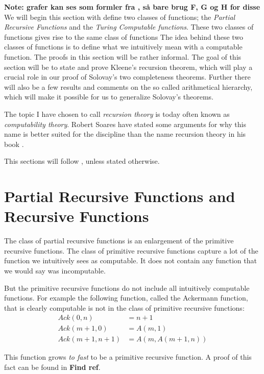 \documentclass[../main.tex]{subfiles}
\begin{document}
\textbf{Note: grafer kan ses som formler fra \PRA, så bare brug F, G og H for
disse}
We will begin this section with define two classes of functions;
the \textit{Partial Recursive Functions} and  the \textit{Turing Computable
functions}. These two classes of functions gives rise to the same class of
functions The idea behind these two classes of functions is to define what
we intuitively mean with a computable function. The proofs in this section will
be rather informal. The goal of this section will be to state and prove
Kleene's recursion theorem, which will play a crucial role in our proof of 
Solovay's two  completeness theorems. Further there will also be a few results and
comments on the so called arithmetical hierarchy, which will make it possible
for us to generalize Solovay's theorems.

The topic I have chosen to call \textit{recursion theory} is today often known as
\textit{computability theory}. Robert Soares have stated some arguments for why this
name is better suited for the discipline than the name recursion theory in his
book \parencite{Soare2016}.

This sections will follow \parencite{Soare1987}, unless stated otherwise. 

\section{Partial Recursive Functions and Recursive Functions}
The class of partial recursive functions is an enlargement of the primitive recursive
functions. The class of primitive recursive functions capture a lot of the
function we intuitively sees as computable. It does not contain any function that
we would say was incomputable.

But the primitive recursive functions do not include all intuitively computable
functions. For example the following function, called the Ackermann function,  that is clearly computable is not
in the class of primitive recursive functions:
\begin{align*}
	Ack(0,n)&=n+1\\
	Ack(m+1,0)&=A(m,1)\\
	Ack(m+1,n+1)&=A(m,A(m+1,n))
\end{align*}

This function grows \textit{to fast} to be a primitive recursive function. A
proof of this fact can be found in \textbf{Find ref}.
\end{document}
